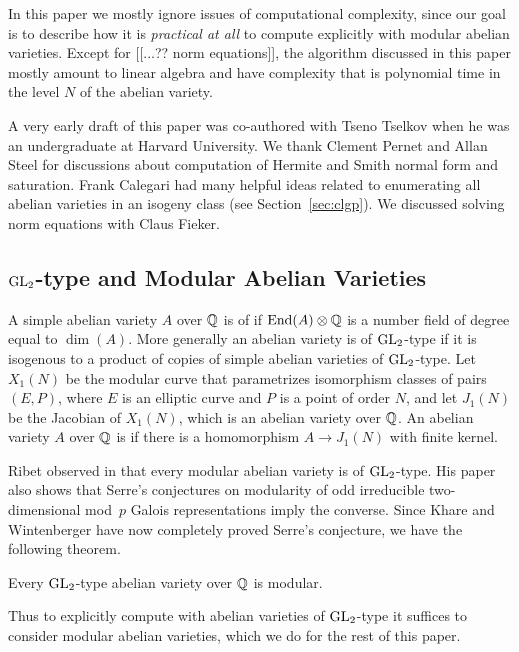 \documentclass{article}
\begin{document}
In this paper we mostly ignore issues of computational complexity,
since our goal is to describe how it is {\em practical at all} to
compute explicitly with modular abelian varieties.  Except for [[...??
norm equations]], the algorithm discussed in this paper mostly amount
to linear algebra and have complexity that is polynomial time in the
level $N$ of the abelian variety.


\vspace{2em}
 A very early draft of this paper was
co-authored with Tseno Tselkov when he was an undergraduate at Harvard
University.  We thank Clement Pernet and Allan Steel for discussions
about computation of Hermite and Smith normal form and saturation.
Frank Calegari had many helpful ideas related to enumerating all
abelian varieties in an isogeny class (see Section~\ref{sec:clgp}).
We discussed solving norm equations with Claus Fieker.

\subsection{$\operatorname{GL}_2$-type and Modular Abelian Varieties}
A simple abelian variety $A$ over $\mathbb{Q}$ is of  if
$\operatorname{End}(A)\otimes\mathbb{Q}$ is a number field of degree equal to $\dim(A)$.
More generally an abelian variety is of $\operatorname{GL}_2$-type if it is
isogenous to a product of copies of simple abelian varieties of
$\operatorname{GL}_2$-type.  Let $X_1(N)$ be the modular curve that parametrizes
isomorphism classes of pairs $(E,P)$, where $E$ is an elliptic curve
and $P$ is a point of order $N$, and let $J_1(N)$ be the Jacobian of
$X_1(N)$, which is an abelian variety over $\mathbb{Q}$.  An abelian variety
$A$ over $\mathbb{Q}$ is  if there is a homomorphism $A \to
J_1(N)$ with finite kernel.

Ribet observed in \cite[\S3]{ribet:abvars} that every modular abelian
variety is of $\operatorname{GL}_2$-type.  His paper also shows
\cite[Thm.~4.4]{ribet:abvars} that Serre's conjectures
\cite{serre:conjectures} on modularity of odd irreducible
two-dimensional mod~$p$ Galois representations imply the converse.
Since Khare and Wintenberger have now completely proved Serre's
conjecture, we have the following theorem.

\begin{theorem}\label{conj:ribmod}
Every $\operatorname{GL}_2$-type abelian variety over $\mathbb{Q}$ is modular.
\end{theorem}
Thus to explicitly compute with abelian varieties of $\operatorname{GL}_2$-type it
suffices to consider modular abelian varieties, which we do for the
rest of this paper.
\end{document}

